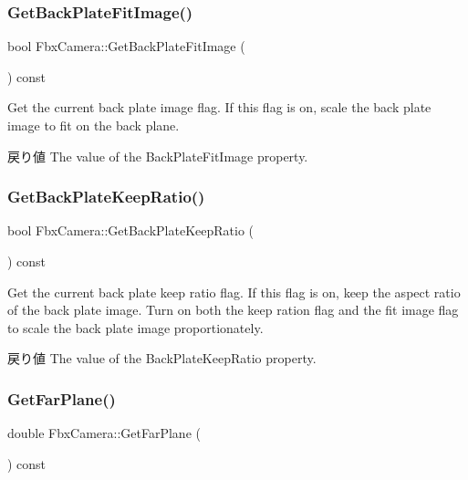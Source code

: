 \subsubsection{\texorpdfstring{Get\+Back\+Plate\+Fit\+Image()}{GetBackPlateFitImage()}}
{\footnotesize\ttfamily bool Fbx\+Camera\+::\+Get\+Back\+Plate\+Fit\+Image (\begin{DoxyParamCaption}{ }\end{DoxyParamCaption}) const}

Get the current back plate image flag. If this flag is on, scale the back plate image to fit on the back plane. \begin{DoxyReturn}{戻り値}
The value of the Back\+Plate\+Fit\+Image property. 
\end{DoxyReturn}
\mbox{\label{class_fbx_camera_a44d26a393e58fec107643992dd3bb439}} 
\subsubsection{\texorpdfstring{Get\+Back\+Plate\+Keep\+Ratio()}{GetBackPlateKeepRatio()}}
{\footnotesize\ttfamily bool Fbx\+Camera\+::\+Get\+Back\+Plate\+Keep\+Ratio (\begin{DoxyParamCaption}{ }\end{DoxyParamCaption}) const}

Get the current back plate keep ratio flag. If this flag is on, keep the aspect ratio of the back plate image. Turn on both the keep ration flag and the fit image flag to scale the back plate image proportionately. \begin{DoxyReturn}{戻り値}
The value of the Back\+Plate\+Keep\+Ratio property. 
\end{DoxyReturn}
\mbox{\label{class_fbx_camera_a07b8a3633669335c8adde9049574d5cc}} 
\subsubsection{\texorpdfstring{Get\+Far\+Plane()}{GetFarPlane()}}
{\footnotesize\ttfamily double Fbx\+Camera\+::\+Get\+Far\+Plane (\begin{DoxyParamCaption}{ }\end{DoxyParamCaption}) const}


